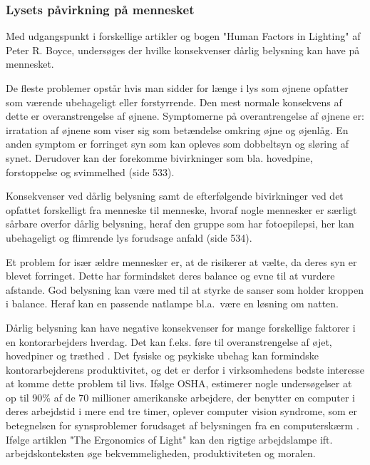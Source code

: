 \subsubsection{Lysets påvirkning på mennesket} 
\label{sec:konsekvenser}

Med udgangspunkt i forskellige artikler og bogen "Human Factors in Lighting" af Peter R. Boyce, undersøges der hvilke konsekvenser dårlig belysning kan have på mennesket. 

De fleste problemer opstår hvis man sidder for længe i lys som øjnene opfatter som værende ubehageligt eller forstyrrende. Den mest normale konsekvens af dette er overanstrengelse af øjnene. Symptomerne på overantrengelse af øjnene er: irratation af øjnene som viser sig som betændelse omkring øjne og øjenlåg. En anden symptom er forringet syn som kan opleves som dobbeltsyn og sløring af synet. Derudover kan der forekomme bivirkninger som bla. hovedpine, forstoppelse og svimmelhed \cite{human_factors}(side 533).

Konsekvenser ved dårlig belysning samt de efterfølgende bivirkninger ved det opfattet forskelligt fra menneske til menneske, hvoraf nogle mennesker er særligt sårbare overfor dårlig belysning, heraf den gruppe som har fotoepilepsi, her kan ubehageligt og flimrende lys forudsage anfald \cite{human_factors}(side 534). 

Et problem for især ældre mennesker er, at de risikerer at vælte, da deres syn er blevet forringet. Dette har formindsket deres balance og evne til at vurdere afstande. God belysning kan være med til at styrke de sanser som holder kroppen i balance. Heraf kan en passende natlampe bl.a.\ være en løsning om natten\cite{human_factors}. 

Dårlig belysning kan have negative konsekvenser for mange forskellige faktorer i en kontorarbejders hverdag. Det kan f.eks. føre til overanstrengelse af øjet, hovedpiner og træthed \cite{ergonomi_arbejdsplads}. Det fysiske og psykiske ubehag kan formindske kontorarbejderens produktivitet, og det er derfor i virksomhedens bedste interesse at komme dette problem til livs. Ifølge OSHA, estimerer nogle undersøgelser at op til 90\% af de 70 millioner amerikanske arbejdere, der benytter en computer i deres arbejdstid i mere end tre timer, oplever computer vision syndrome, som er betegnelsen for synsproblemer forudsaget af belysningen fra en computerskærm \cite{CVS}. Ifølge artiklen "The Ergonomics of Light" kan den rigtige arbejdslampe ift. arbejdskonteksten øge bekvemmeligheden, produktiviteten og moralen\cite{ergonomi_arbejdsplads}. 